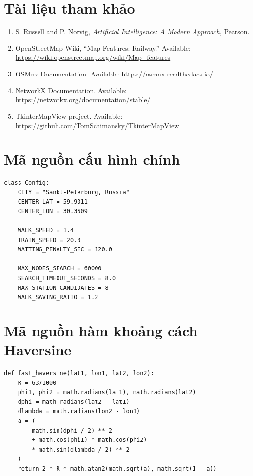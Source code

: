 \documentclass[12pt,a4paper]{article}
\begin{document}
\newpage
\section*{Tài liệu tham khảo}

\begin{enumerate}
    \item S. Russell and P. Norvig, \textit{Artificial Intelligence: A Modern Approach}, Pearson.
    \item OpenStreetMap Wiki, ``Map Features: Railway.'' Available: \url{https://wiki.openstreetmap.org/wiki/Map_features}
    \item OSMnx Documentation. Available: \url{https://osmnx.readthedocs.io/}
    \item NetworkX Documentation. Available: \url{https://networkx.org/documentation/stable/}
    \item TkinterMapView project. Available: \url{https://github.com/TomSchimansky/TkinterMapView}
\end{enumerate}

\newpage
\appendix

\section{Mã nguồn cấu hình chính}

\begin{lstlisting}[style=pythonstyle, caption={Cấu hình chính của chương trình}]
class Config:
    CITY = "Sankt-Peterburg, Russia"
    CENTER_LAT = 59.9311
    CENTER_LON = 30.3609

    WALK_SPEED = 1.4
    TRAIN_SPEED = 20.0
    WAITING_PENALTY_SEC = 120.0

    MAX_NODES_SEARCH = 60000
    SEARCH_TIMEOUT_SECONDS = 8.0
    MAX_STATION_CANDIDATES = 8
    WALK_SAVING_RATIO = 1.2
\end{lstlisting}

\section{Mã nguồn hàm khoảng cách Haversine}

\begin{lstlisting}[style=pythonstyle, caption={Tính khoảng cách giữa hai tọa độ địa lý}]
def fast_haversine(lat1, lon1, lat2, lon2):
    R = 6371000
    phi1, phi2 = math.radians(lat1), math.radians(lat2)
    dphi = math.radians(lat2 - lat1)
    dlambda = math.radians(lon2 - lon1)
    a = (
        math.sin(dphi / 2) ** 2
        + math.cos(phi1) * math.cos(phi2)
        * math.sin(dlambda / 2) ** 2
    )
    return 2 * R * math.atan2(math.sqrt(a), math.sqrt(1 - a))
\end{lstlisting}
\end{document}
